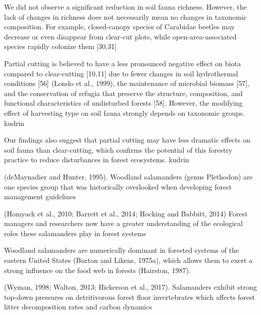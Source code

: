 We did not observe a significant reduction in soil fauna richness. However, the lack of changes in richness does not necessarily mean no changes in taxonomic composition. For example, closed-canopy species of Carabidae beetles may decrease or even disappear from clear-cut plots, while open-area-associated species rapidly colonize them [30,31]

Partial cutting is believed to have a less pronounced negative effect on biota compared to clear-cutting [10,11] due to fewer changes in soil hydrothermal conditions [56] (Londo et al., 1999), the maintenance of microbial biomass [57], and the conservation of refugia that preserve the structure, composition, and functional characteristics of undisturbed forests [58]. However, the modifying effect of harvesting type on soil fauna strongly depends on taxonomic groups. kudrin

Our findings also suggest that partial cutting may have less dramatic effects on soil fauna than clear-cutting, which confirms the potential of this forestry practice to reduce disturbances in forest ecosystems. kudrin

(deMaynadier and Hunter, 1995). Woodland salamanders (genus Plethodon) are one species group that was historically overlooked when developing forest management guidelines 


(Homyack et al., 2010; Barrett et al., 2014; Hocking and Babbitt, 2014) Forest managers and researchers now have a greater understanding of the ecological roles these salamanders play in forest systems 

Woodland salamanders are numerically dominant in forested systems of the eastern United States (Burton and Likens, 1975a), which allows them to exert a strong influence on the food web in forests (Hairston, 1987).

(Wyman, 1998; Walton, 2013; Hickerson et al., 2017). Salamanders exhibit strong top-down pressures on detritivorous forest floor invertebrates which affects forest litter decomposition rates and carbon dynamics 

